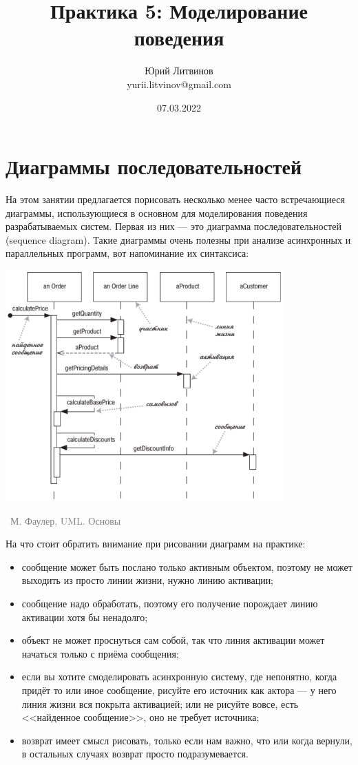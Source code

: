 \documentclass[a5paper]{article}
\title{Практика 5: Моделирование поведения}
\author{Юрий Литвинов\\\small{yurii.litvinov@gmail.com}}
\date{07.03.2022}
\newcommand{\attribution}[1] {
    \vspace{-5mm}\begin{flushright}\begin{scriptsize}\textcolor{gray}{\textcopyright\, #1}\end{scriptsize}\end{flushright}
}
\begin{document}
\maketitle
\thispagestyle{empty}

\section{Диаграммы последовательностей}

На этом занятии предлагается порисовать несколько менее часто встречающиеся диаграммы, использующиеся в основном для моделирования поведения разрабатываемых систем. Первая из них --- это диаграмма последовательностей (sequence diagram). Такие диаграммы очень полезны при анализе асинхронных и параллельных программ, вот напоминание их синтаксиса:

\begin{center}
    \includegraphics[width=0.8\textwidth]{sequenceDiagram.png}
    \attribution{М. Фаулер, UML. Основы}
\end{center}

На что стоит обратить внимание при рисовании диаграмм на практике:

\begin{itemize}
    \item сообщение может быть послано только активным объектом, поэтому не может выходить из просто линии жизни, нужно линию активации;
    \item сообщение надо обработать, поэтому его получение порождает линию активации хотя бы ненадолго;
    \item объект не может проснуться сам собой, так что линия активации может начаться только с приёма сообщения;
    \item если вы хотите смоделировать асинхронную систему, где непонятно, когда придёт то или иное сообщение, рисуйте его источник как актора --- у него линия жизни вся покрыта активацией; или не рисуйте вовсе, есть <<найденное сообщение>>, оно не требует источника;
    \item возврат имеет смысл рисовать, только если нам важно, что или когда вернули, в остальных случаях возврат просто подразумевается.
\end{itemize}
\end{document}

